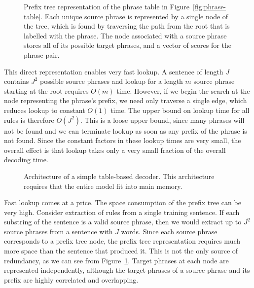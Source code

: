 \figpreamble
\begin{figure}
	\figfontsize{
	\begin{center}
		
	\end{center}}
	\figpostamble
	\caption[Prefix tree representation of the phrase table.]{Prefix tree representation of the phrase table in Figure~\ref{fig:phrase-table}.  Each unique source phrase is represented by a single node of the tree, which is found by traversing the path from the root that is labelled with the phrase.  The node associated with a source phrase stores all of its possible target phrases, and a vector of scores for the phrase pair.}\label{fig:prefix-tree-phrase-table}
\end{figure}

This direct representation enables very fast lookup.  A sentence
of length $J$ contains $J^2$ possible source phrases and lookup for a
length $m$ source phrase starting at the root
requires $O(m)$ time.  However, if we begin the search at the node
representing the phrase's prefix, we need only traverse a single edge,
which reduces lookup to constant $O(1)$ time.  The upper bound on 
lookup time for all rules is therefore $O(J^2)$.  This is a loose upper
bound, since many phrases will not be found and we can terminate
lookup as soon as any prefix of the phrase is not found.  Since
the constant factors in these lookup times are very small, the overall effect
is that lookup takes only a very small fraction of the overall decoding time.

\figpreamble
\begin{figure}
	\figfontsize{
	\begin{center}
		
	\end{center}}
	\figpostamble
	\caption[Architecture of a simple table-based decoder.]{Architecture of a simple table-based decoder.  This architecture requires that
	the entire model fit into main memory.}\label{fig:table-based}
\end{figure}

Fast lookup comes at a price.  The space consumption of the prefix
tree can be very high.   Consider extraction of rules from a single training sentence.
If each substring of the sentence is a valid source phrase, then
we would extract up to $J^2$ source phrases from a sentence
with $J$ words.  Since each source phrase corresponds to a prefix
tree node, the prefix tree representation requires much more space than the
sentence that produced it.  This is not the only source of redundancy,
as we can see from Figure~\ref{fig:prefix-tree-phrase-table}. Target phrases
at each node are represented independently, although the target
phrases of a source phrase and its prefix are highly correlated and
overlapping.

